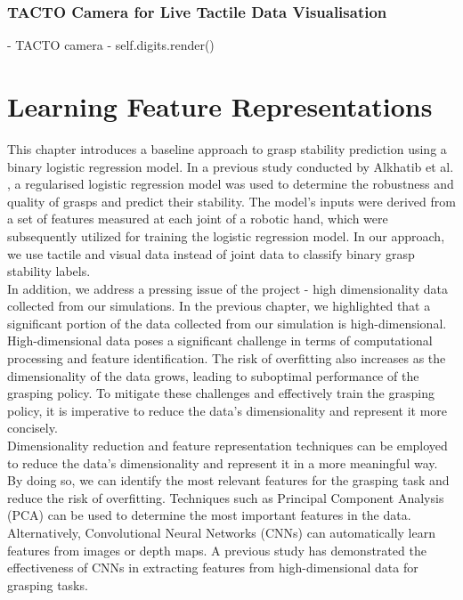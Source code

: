 \documentclass[11pt, a4paper]{report}
\begin{document}
\subsection{TACTO Camera for Live Tactile Data Visualisation}
\label{sec:}
- TACTO camera \cite{Wang2022TACTO}
- self.digits.render()



\chapter{Learning Feature Representations}
\label{chap:4}
This chapter introduces a baseline approach to grasp stability prediction using a binary logistic regression model. In a previous study conducted by Alkhatib et al. \cite{9091340}, a regularised logistic regression model was used to determine the robustness and quality of grasps and predict their stability. The model's inputs were derived from a set of features measured at each joint of a robotic hand, which were subsequently utilized for training the logistic regression model. In our approach, we use tactile and visual data instead of joint data to classify binary grasp stability labels.\\

In addition, we address a pressing issue of the project - high dimensionality data collected from our simulations. In the previous chapter, we highlighted that a significant portion of the data collected from our simulation is high-dimensional. High-dimensional data poses a significant challenge in terms of computational processing and feature identification. The risk of overfitting also increases as the dimensionality of the data grows, leading to suboptimal performance of the grasping policy. To mitigate these challenges and effectively train the grasping policy, it is imperative to reduce the data's dimensionality and represent it more concisely.\\

Dimensionality reduction and feature representation techniques can be employed to reduce the data's dimensionality and represent it in a more meaningful way. By doing so, we can identify the most relevant features for the grasping task and reduce the risk of overfitting. Techniques such as Principal Component Analysis (PCA) can be used to determine the most important features in the data. Alternatively, Convolutional Neural Networks (CNNs) can automatically learn features from images or depth maps. A previous study \cite{Calandra_2018} has demonstrated the effectiveness of CNNs in extracting features from high-dimensional data for grasping tasks.\\
\end{document}
